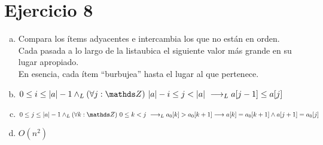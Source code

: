 \documentclass{article}
\begin{document}
    \section*{Ejercicio 8}

    
    
    \begin{enumerate}[a)]
        \item Compara los ítems adyacentes e intercambia los que no están en orden.\\
        Cada pasada a lo largo de la listaubica el siguiente valor más grande en su lugar apropiado.\\
        En esencia, cada ítem “burbujea” hasta el lugar al que pertenece.
        \item $0 \leq i \leq \longitud{a} - 1 \yLuego \paraTodo{j}{\longitud{a}-i}{\longitud{a}} \implicaLuego a[j-1] \leq a[j] $
        \item $0 \leq j \leq \longitud{a} - 1 \yLuego \paraTodo{k}{0}{j} \implicaLuego a_0[k] > a_0[k+1] \implica a[k] = a_0[k+1] \wedge a[j+1] = a_0[j] $
        \item $ O(n^2) $
    \end{enumerate}
\end{document}
